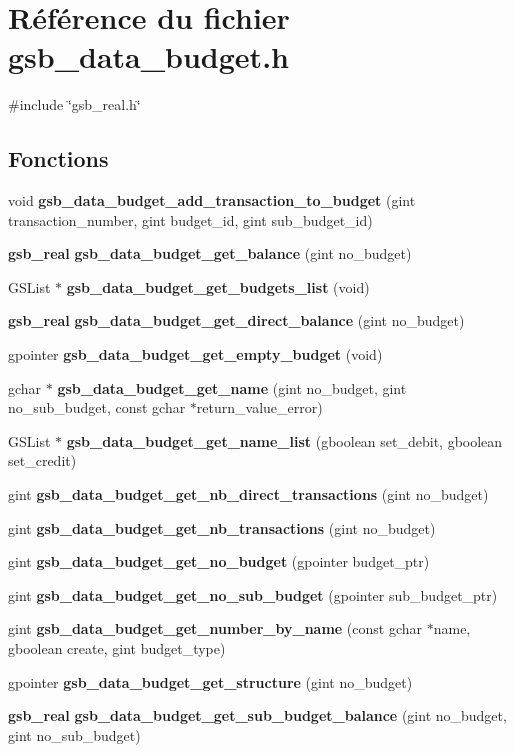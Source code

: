 \section{Référence du fichier gsb\_\-data\_\-budget.h}
\label{gsb__data__budget_8h}
{\ttfamily \#include \char`\"{}gsb\_\-real.h\char`\"{}}\par
\subsection*{Fonctions}
\begin{DoxyCompactItemize}
\item 
void {\bf gsb\_\-data\_\-budget\_\-add\_\-transaction\_\-to\_\-budget} (gint transaction\_\-number, gint budget\_\-id, gint sub\_\-budget\_\-id)
\item 
{\bf gsb\_\-real} {\bf gsb\_\-data\_\-budget\_\-get\_\-balance} (gint no\_\-budget)
\item 
GSList $\ast$ {\bf gsb\_\-data\_\-budget\_\-get\_\-budgets\_\-list} (void)
\item 
{\bf gsb\_\-real} {\bf gsb\_\-data\_\-budget\_\-get\_\-direct\_\-balance} (gint no\_\-budget)
\item 
gpointer {\bf gsb\_\-data\_\-budget\_\-get\_\-empty\_\-budget} (void)
\item 
gchar $\ast$ {\bf gsb\_\-data\_\-budget\_\-get\_\-name} (gint no\_\-budget, gint no\_\-sub\_\-budget, const gchar $\ast$return\_\-value\_\-error)
\item 
GSList $\ast$ {\bf gsb\_\-data\_\-budget\_\-get\_\-name\_\-list} (gboolean set\_\-debit, gboolean set\_\-credit)
\item 
gint {\bf gsb\_\-data\_\-budget\_\-get\_\-nb\_\-direct\_\-transactions} (gint no\_\-budget)
\item 
gint {\bf gsb\_\-data\_\-budget\_\-get\_\-nb\_\-transactions} (gint no\_\-budget)
\item 
gint {\bf gsb\_\-data\_\-budget\_\-get\_\-no\_\-budget} (gpointer budget\_\-ptr)
\item 
gint {\bf gsb\_\-data\_\-budget\_\-get\_\-no\_\-sub\_\-budget} (gpointer sub\_\-budget\_\-ptr)
\item 
gint {\bf gsb\_\-data\_\-budget\_\-get\_\-number\_\-by\_\-name} (const gchar $\ast$name, gboolean create, gint budget\_\-type)
\item 
gpointer {\bf gsb\_\-data\_\-budget\_\-get\_\-structure} (gint no\_\-budget)
\item 
{\bf gsb\_\-real} {\bf gsb\_\-data\_\-budget\_\-get\_\-sub\_\-budget\_\-balance} (gint no\_\-budget, gint no\_\-sub\_\-budget)

\end{DoxyCompactItemize}

